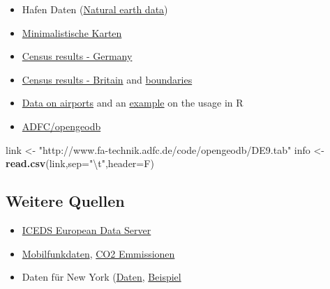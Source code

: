 \documentclass[]{article}
\newenvironment{Shaded}{\begin{snugshade}}{\end{snugshade}}
\newcommand{\KeywordTok}[1]{\textcolor[rgb]{0.13,0.29,0.53}{\textbf{{#1}}}}
\newcommand{\DataTypeTok}[1]{\textcolor[rgb]{0.13,0.29,0.53}{{#1}}}
\newcommand{\CharTok}[1]{\textcolor[rgb]{0.31,0.60,0.02}{{#1}}}
\newcommand{\StringTok}[1]{\textcolor[rgb]{0.31,0.60,0.02}{{#1}}}
\newcommand{\NormalTok}[1]{{#1}}
\begin{document}
\begin{itemize}
\item
  Hafen Daten
  (\href{http://www.naturalearthdata.com/downloads/10m-cultural-vectors/}{Natural
  earth data})
\item
  \href{http://www.r-bloggers.com/minimalist-maps/}{Minimalistische
  Karten}
\item
  \href{https://ergebnisse.zensus2011.de/}{Census results - Germany}
\item
  \href{http://www.r-bloggers.com/2011-census-open-atlas-project/}{Census
  results - Britain} and
  \href{http://www.ons.gov.uk/ons/guide-method/census/2011/census-data/2011-census-prospectus/new-developments-for-2011-census-results/2011-census-geography/2011-census-geography-prospectus/index.html}{boundaries}
\item
  \href{http://openflights.org/data.html}{Data on airports} and an
  \href{http://www.milanor.net/blog/?p=594}{example} on the usage in R
\item
  \href{http://www.fa-technik.adfc.de/code/opengeodb/}{ADFC/opengeodb}
\end{itemize}

\begin{Shaded}
\begin{Highlighting}[]
\NormalTok{link <-}\StringTok{ "http://www.fa-technik.adfc.de/code/opengeodb/DE9.tab"}
\NormalTok{info <-}\StringTok{ }\KeywordTok{read.csv}\NormalTok{(link,}\DataTypeTok{sep=}\StringTok{"}\CharTok{\textbackslash{}t}\StringTok{"}\NormalTok{,}\DataTypeTok{header=}\NormalTok{F)}
\end{Highlighting}
\end{Shaded}

\subsection{Weitere Quellen}\label{weitere-quellen}

\begin{itemize}
\item
  \href{http://geocommons.com/overlays/96341}{ICEDS European Data
  Server}
\item
  \href{http://opencellid.org/}{Mobilfunkdaten},
  \href{http://databank.worldbank.org/data/reports.aspx?source=2\&country=DEU\&series=\&period=}{CO2
  Emmissionen}
\item
  Daten für New York (\href{https://data.cityofnewyork.us/}{Daten},
  \href{https://data.cityofnewyork.us/City-Government/Parking-Violations-Issued-Fiscal-Year-2014-August-/jt7v-77mi}{Beispiel}
\end{itemize}
\end{document}
